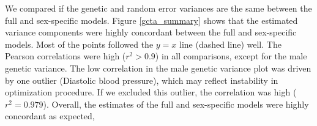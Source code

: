 \documentclass[11pt]{article}
\begin{document}
We compared if the genetic and random error variances are the same between the full and sex-specific models.
Figure \ref{gcta_summary} shows that the estimated variance components were highly concordant between the full and sex-specific models.
Most of the points followed the $y=x$ line (dashed line) well.
The Pearson correlations were high ($r^2>0.9$) in all comparisons, except for the male genetic variance.
The low correlation in the male genetic variance plot was driven by 
one outlier (Diastolic blood pressure), which may reflect instability in optimization procedure.
If we excluded this outlier, the correlation was high ($r^2=0.979$).
Overall, the estimates of the full and sex-specific models were highly concordant as expected,

\end{document}
